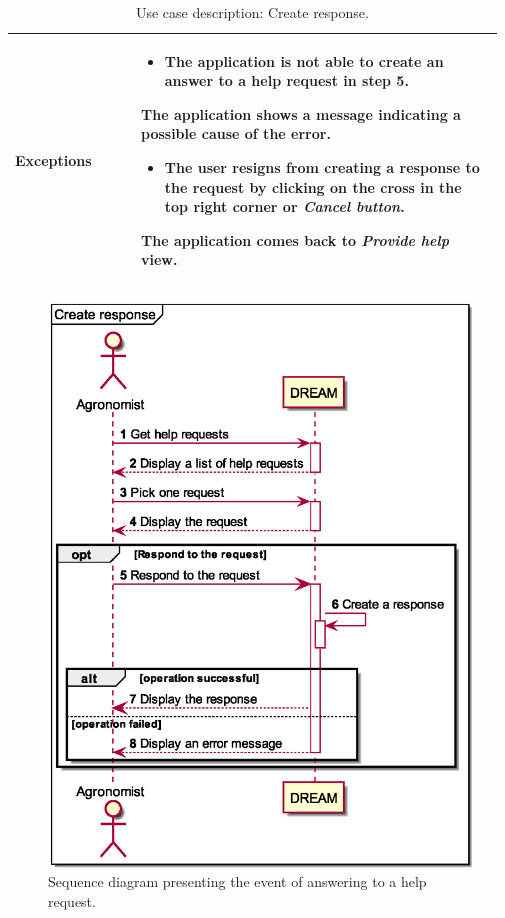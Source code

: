 \begin{table}[H]
\begin{tabular}{@{}p{0.25\linewidth} p{0.72\linewidth}@{}}
		\textbf{Exceptions}         & 
	    \begin{itemize}[leftmargin=.4cm,noitemsep,topsep=0pt,before=\vspace{-3mm}]
		   \item The application is not able to create an answer to a help request in step 5. 
		\end{itemize}
		The application shows a message indicating a possible cause of the error.
		\begin{itemize}[leftmargin=.4cm,noitemsep,before=\vspace{-3mm}]
		   \item The user resigns from creating a response to the request by clicking on the cross in the top right corner or \textit{Cancel button}. 
		\end{itemize}
		The application comes back to \textit{Provide help} view.
		\\\bottomrule
	\end{tabular}
	\caption{Use case description: Create response.} 
\end{table}

\begin{figure}[H]
    \centering
    \includegraphics[scale=0.6, keepaspectratio, origin=c]{diagrams/sequence/create_response}
    \caption{Sequence diagram presenting the event of answering to a help request.}
    \label{fig:sd_create_response}
\end{figure}

